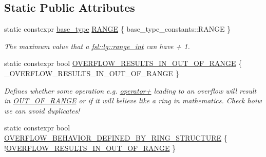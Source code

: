 \subsection*{Static Public Attributes}
\begin{DoxyCompactItemize}
\item 
static constexpr \mbox{\hyperlink{classfsl_1_1lg_1_1range__int_a4ce67cd216fd303b7bae83a7cbcab3bb}{base\+\_\+type}} \mbox{\hyperlink{classfsl_1_1lg_1_1range__int_a438be32af68025525703578ac9fdcd09}{R\+A\+N\+GE}} \{ base\+\_\+type\+\_\+constants\+::\+R\+A\+N\+GE \}
\begin{DoxyCompactList}\small\item\em The maximum value that a \mbox{\hyperlink{classfsl_1_1lg_1_1range__int}{fsl\+::lg\+::range\+\_\+int}} can have + 1. \end{DoxyCompactList}\item 
\mbox{\label{classfsl_1_1lg_1_1range__int_a48bbbbf32a26bb023ae20b445f45b1f3}} 
static constexpr bool \mbox{\hyperlink{classfsl_1_1lg_1_1range__int_a48bbbbf32a26bb023ae20b445f45b1f3}{O\+V\+E\+R\+F\+L\+O\+W\+\_\+\+R\+E\+S\+U\+L\+T\+S\+\_\+\+I\+N\+\_\+\+O\+U\+T\+\_\+\+O\+F\+\_\+\+R\+A\+N\+GE}} \{ \+\_\+\+O\+V\+E\+R\+F\+L\+O\+W\+\_\+\+R\+E\+S\+U\+L\+T\+S\+\_\+\+I\+N\+\_\+\+O\+U\+T\+\_\+\+O\+F\+\_\+\+R\+A\+N\+GE \}
\begin{DoxyCompactList}\small\item\em Defines whether some operation e.\+g. \mbox{\hyperlink{classfsl_1_1lg_1_1range__int_a61dfb1dc667dbb7afefa10680749c8e4}{operator+}} leading to an overflow will result in \mbox{\hyperlink{classfsl_1_1lg_1_1range__int_acbcdf600daa56d701bdf215ccfb43ce7}{O\+U\+T\+\_\+\+O\+F\+\_\+\+R\+A\+N\+GE}} or if it will believe like a ring in mathematics. Check hoiw we can avoid duplicates! \end{DoxyCompactList}\item 
\mbox{\label{classfsl_1_1lg_1_1range__int_a4e3a6eaf28621741980dfe3aadebc6f6}} 
static constexpr bool \mbox{\hyperlink{classfsl_1_1lg_1_1range__int_a4e3a6eaf28621741980dfe3aadebc6f6}{O\+V\+E\+R\+F\+L\+O\+W\+\_\+\+B\+E\+H\+A\+V\+I\+O\+R\+\_\+\+D\+E\+F\+I\+N\+E\+D\+\_\+\+B\+Y\+\_\+\+R\+I\+N\+G\+\_\+\+S\+T\+R\+U\+C\+T\+U\+RE}} \{ !\mbox{\hyperlink{classfsl_1_1lg_1_1range__int_a48bbbbf32a26bb023ae20b445f45b1f3}{O\+V\+E\+R\+F\+L\+O\+W\+\_\+\+R\+E\+S\+U\+L\+T\+S\+\_\+\+I\+N\+\_\+\+O\+U\+T\+\_\+\+O\+F\+\_\+\+R\+A\+N\+GE}} \}

\end{DoxyCompactItemize}
